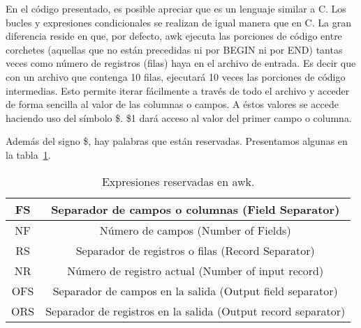 En el código presentado, es posible apreciar que es un lenguaje similar a C. Los bucles y expresiones condicionales se realizan de igual manera que
en C. La gran diferencia reside en que, por defecto, awk ejecuta las porciones de código entre corchetes (aquellas que no están precedidas ni por 
BEGIN ni por END) tantas veces como número de registros (filas) haya en el archivo de entrada. Es decir que con un archivo que contenga 10 filas, ejecutará
10 veces las porciones de código intermedias. Esto permite iterar fácilmente a través de todo el archivo y acceder de forma sencilla al valor de
las columnas o campos. A éstos valores se accede haciendo uso del símbolo \$. \$1 dará acceso al valor del primer campo o columna.

Además del signo \$, hay palabras que están reservadas. Presentamos algunas en la tabla~\ref{AC:tbl:awkReserved}.
\begin{table}[htp]
\begin{center}
\begin{tabular}{*{2}{c}}
\hline
FS&	Separador de campos o columnas (Field Separator)\\ \hline
NF&	Número de campos (Number of Fields)\\ \hline
RS&	Separador de registros o filas (Record Separator)\\ \hline
NR&	Número de registro actual (Number of input record)\\ \hline
OFS&	Separador de campos en la salida (Output field separator)\\ \hline
ORS&	Separador de registros en la salida (Output record separator)\\ \hline
\end{tabular}
\end{center}
\caption[Expresiones reservadas en awk.]{Expresiones reservadas en awk.}
\label{AC:tbl:awkReserved}
\end{table}